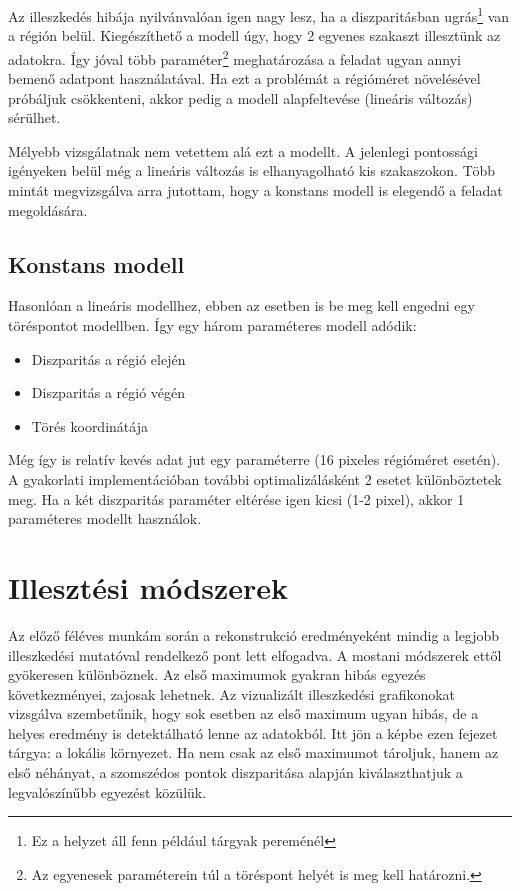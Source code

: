 Az illeszkedés hibája nyilvánvalóan igen nagy lesz, ha a diszparitásban ugrás\footnote{Ez a helyzet áll fenn például tárgyak pereménél} van a régión belül.
Kiegészíthető a modell úgy, hogy 2 egyenes szakaszt illesztünk az adatokra.
Így jóval több paraméter\footnote{Az egyenesek paraméterein túl a töréspont helyét is meg kell határozni.} meghatározása a feladat ugyan annyi bemenő adatpont használatával.
Ha ezt a problémát a régióméret növelésével próbáljuk csökkenteni, akkor pedig a modell alapfeltevése (lineáris változás) sérülhet.

Mélyebb vizsgálatnak nem vetettem alá ezt a modellt.
A jelenlegi pontossági igényeken belül még a lineáris változás is elhanyagolható kis szakaszokon.
Több mintát megvizsgálva arra jutottam, hogy a konstans modell is elegendő a feladat megoldására.

\subsection{Konstans modell}\label{sect:constModel}

Hasonlóan a lineáris modellhez, ebben az esetben is be meg kell engedni egy töréspontot modellben.
Így egy három paraméteres modell adódik:
\begin{itemize}[noitemsep]
\item Diszparitás a régió elején
\item Diszparitás a régió végén
\item Törés koordinátája
\end{itemize}

Még így is relatív kevés adat jut egy paraméterre (16 pixeles régióméret esetén).
A gyakorlati implementációban további optimalizálásként 2 esetet különböztetek meg.
Ha a két diszparitás paraméter eltérése igen kicsi (1-2 pixel), akkor 1 paraméteres modellt használok.

\section{Illesztési módszerek}\label{sect:modelMatch}

Az előző féléves munkám során a rekonstrukció eredményeként mindig a legjobb illeszkedési mutatóval rendelkező pont lett elfogadva.
A mostani módszerek ettől gyökeresen különböznek.
Az első maximumok gyakran hibás egyezés következményei, zajosak lehetnek.
Az vizualizált illeszkedési grafikonokat vizsgálva szembetűnik, hogy sok esetben az első maximum ugyan hibás, de a helyes eredmény is detektálható lenne az adatokból.
Itt jön a képbe ezen fejezet tárgya: a lokális környezet.
Ha nem csak az első maximumot tároljuk, hanem az első néhányat, a szomszédos pontok diszparitása alapján kiválaszthatjuk a legvalószínűbb egyezést közülük.

